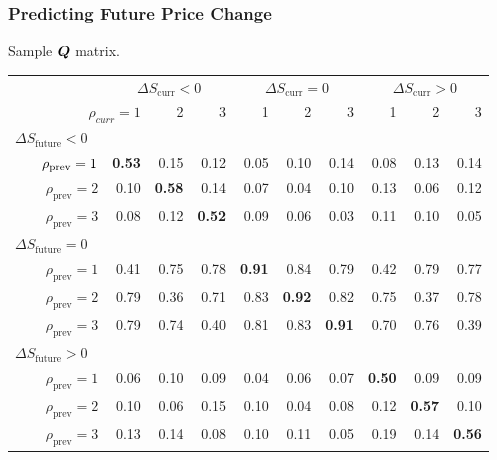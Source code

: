 \begin{frame}
\frametitle{Predicting Future Price Change}
Sample $\boldsymbol{Q}$ matrix.
\begin{table}%
%
\begin{adjustbox}{width=\textwidth}
\begin{tabular}{@{} r@{\hskip 1cm} *{9}{r} @{}}%
\toprule
& \multicolumn{3}{c}{$\Delta S_\text{curr} < 0$} & \multicolumn{3}{c}{$\Delta S_\text{curr} = 0$} & \multicolumn{3}{c}{$\Delta S_\text{curr} > 0$} \\
\cmidrule(lr){2-4} \cmidrule(lr){5-7} \cmidrule(lr){8-10}
\multicolumn{2}{r}{$\rho_{curr} = 1$} & 2 & 3 & 1 & 2 & 3 & 1 & 2 & 3 \\
\midrule
\multicolumn{10}{l}{$\Delta S_\text{future} < 0$} \\
$\hphantom{abcd}\rho_\text{prev} = 1$ & \bf 0.53 & 0.15 & 0.12 & 0.05 & 0.10 & 0.14 & 0.08 & 0.13 & 0.14 \\
$\rho_\text{prev} = 2$ & 0.10 & \bf 0.58 & 0.14 & 0.07 & 0.04 & 0.10 & 0.13 & 0.06 & 0.12 \\
$\rho_\text{prev} = 3$ & 0.08 & 0.12 & \bf 0.52 & 0.09 & 0.06 & 0.03 & 0.11 & 0.10 & 0.05 \\[0.6ex]
\multicolumn{10}{l}{$\Delta S_\text{future} = 0$} \\
$\rho_\text{prev} = 1$ & 0.41 & 0.75 & 0.78 & \bf 0.91 & 0.84 & 0.79 & 0.42 & 0.79 & 0.77 \\
$\rho_\text{prev} = 2$ & 0.79 & 0.36 & 0.71 & 0.83 & \bf 0.92 & 0.82 & 0.75 & 0.37 & 0.78 \\
$\rho_\text{prev} = 3$ & 0.79 & 0.74 & 0.40 & 0.81 & 0.83 & \bf 0.91 & 0.70 & 0.76 & 0.39 \\[0.6ex]
\multicolumn{10}{l}{$\Delta S_\text{future} > 0$} \\
$\rho_\text{prev} = 1$ & 0.06 & 0.10 & 0.09 & 0.04 & 0.06 & 0.07 & \bf 0.50 & 0.09 & 0.09 \\
$\rho_\text{prev} = 2$ & 0.10 & 0.06 & 0.15 & 0.10 & 0.04 & 0.08 & 0.12 & \bf 0.57 & 0.10 \\
$\rho_\text{prev} = 3$ & 0.13 & 0.14 & 0.08 & 0.10 & 0.11 & 0.05 & 0.19 & 0.14 & \bf 0.56 \\
\bottomrule
\end{tabular}%
\end{adjustbox}%
\end{table}%
\end{frame}
%
